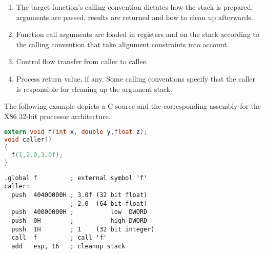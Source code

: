 \begin{enumerate}
\item The target function's calling convention dictates how the stack is 
prepared, arguments are passed, results are returned and how to clean up
afterwards.
\item Function call arguments are loaded in registers and on the stack according
to the calling convention that take alignment constraints into account.
\item Control flow transfer from caller to callee.
\item Process return value, if any. Some calling conventions specify that
the caller is responsible for cleaning up the argument stack.
\end{enumerate}


\newpage

The following example depicts a C source and the corresponding assembly for the X86 32-bit processor architecture.


\begin{lstlisting}[label=cfuncall,caption=C function call,language=C]
extern void f(int x, double y,float z);
void caller()
{
  f(1,2.0,3.0f);
}
\end{lstlisting}


\begin{lstlisting}[label=x86asm,caption=Assembly X86 32-bit function call,language={[x86masm]Assembler}]
.global f         ; external symbol 'f'
caller:
  push  40400000H ; 3.0f (32 bit float)
                  ; 2.0  (64 bit float)
  push  40000000H ;          low  DWORD
  push  0H        ;          high DWORD 
  push  1H        ; 1    (32 bit integer)
  call  f         ; call 'f'
  add   esp, 16   ; cleanup stack
\end{lstlisting}


